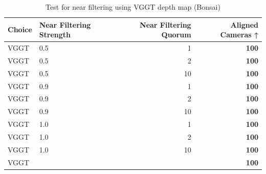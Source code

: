\begin{table}[H]
\caption{Test for near filtering using VGGT depth map (Bonsai)}
\label{tab:99_near_filtering_bonsai}
\begin{tabular}{llrr}
\toprule
Choice & Near Filtering Strength & Near Filtering Quorum & Aligned Cameras ↑ \\
\midrule
VGGT & 0.5 & 1 & \textbf{100} \\
VGGT & 0.5 & 2 & \textbf{100} \\
VGGT & 0.5 & 10 & \textbf{100} \\
VGGT & 0.9 & 1 & \textbf{100} \\
VGGT & 0.9 & 2 & \textbf{100} \\
VGGT & 0.9 & 10 & \textbf{100} \\
VGGT & 1.0 & 1 & \textbf{100} \\
VGGT & 1.0 & 2 & \textbf{100} \\
VGGT & 1.0 & 10 & \textbf{100} \\
VGGT &  &  & \textbf{100} \\
\bottomrule
\end{tabular}
\end{table}
